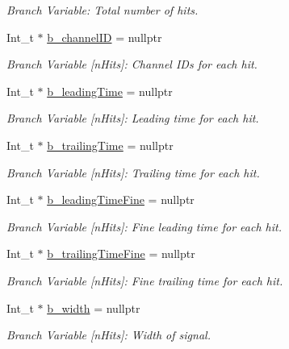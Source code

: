 \begin{DoxyCompactItemize}
\begin{DoxyCompactList}\small\item\em Branch Variable\+: Total number of hits. \end{DoxyCompactList}\item 
Int\+\_\+t $\ast$ \hyperlink{class_event_tree_manager_a2bb8b2f71311b73c3003b039cb31833d}{b\+\_\+channel\+ID} = nullptr
\begin{DoxyCompactList}\small\item\em Branch Variable \mbox{[}n\+Hits\mbox{]}\+: Channel I\+Ds for each hit. \end{DoxyCompactList}\item 
Int\+\_\+t $\ast$ \hyperlink{class_event_tree_manager_ac677077b9c14946f9461ecaf758a00f1}{b\+\_\+leading\+Time} = nullptr
\begin{DoxyCompactList}\small\item\em Branch Variable \mbox{[}n\+Hits\mbox{]}\+: Leading time for each hit. \end{DoxyCompactList}\item 
Int\+\_\+t $\ast$ \hyperlink{class_event_tree_manager_a96536e0bc82a2b7832ed4c1e1b55e200}{b\+\_\+trailing\+Time} = nullptr
\begin{DoxyCompactList}\small\item\em Branch Variable \mbox{[}n\+Hits\mbox{]}\+: Trailing time for each hit. \end{DoxyCompactList}\item 
Int\+\_\+t $\ast$ \hyperlink{class_event_tree_manager_a825f39c3fc9edd37d0efc0022c307f3c}{b\+\_\+leading\+Time\+Fine} = nullptr
\begin{DoxyCompactList}\small\item\em Branch Variable \mbox{[}n\+Hits\mbox{]}\+: Fine leading time for each hit. \end{DoxyCompactList}\item 
Int\+\_\+t $\ast$ \hyperlink{class_event_tree_manager_a8a586ada4ae87e18dafb9e5dae91dde2}{b\+\_\+trailing\+Time\+Fine} = nullptr
\begin{DoxyCompactList}\small\item\em Branch Variable \mbox{[}n\+Hits\mbox{]}\+: Fine trailing time for each hit. \end{DoxyCompactList}\item 
Int\+\_\+t $\ast$ \hyperlink{class_event_tree_manager_aa65fec5d7e3a3b3983730033a6a4a7b8}{b\+\_\+width} = nullptr
\begin{DoxyCompactList}\small\item\em Branch Variable \mbox{[}n\+Hits\mbox{]}\+: Width of signal. \end{DoxyCompactList}\end{DoxyCompactItemize}
